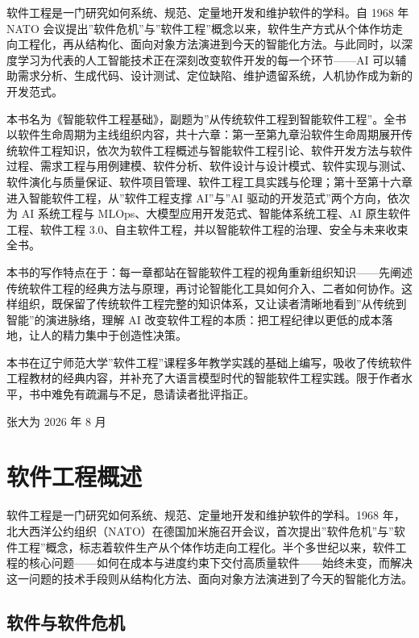\documentclass[12pt,a4paper,twoside,openany]{ctexbook}
\numberwithin{figure}{chapter}
\numberwithin{table}{chapter}
\begin{document}
软件工程是一门研究如何系统、规范、定量地开发和维护软件的学科。自 1968 年
NATO
会议提出''软件危机''与''软件工程''概念以来，软件生产方式从个体作坊走向工程化，再从结构化、面向对象方法演进到今天的智能化方法。与此同时，以深度学习为代表的人工智能技术正在深刻改变软件开发的每一个环节------AI
可以辅助需求分析、生成代码、设计测试、定位缺陷、维护遗留系统，人机协作成为新的开发范式。

本书名为《智能软件工程基础》，副题为''从传统软件工程到智能软件工程''。全书以软件生命周期为主线组织内容，共十六章：第一至第九章沿软件生命周期展开传统软件工程知识，依次为软件工程概述与智能软件工程引论、软件开发方法与软件过程、需求工程与用例建模、软件分析、软件设计与设计模式、软件实现与测试、软件演化与质量保证、软件项目管理、软件工程工具实践与伦理；第十至第十六章进入智能软件工程，从''软件工程支撑
AI''与''AI 驱动的开发范式''两个方向，依次为 AI 系统工程与
MLOps、大模型应用开发范式、智能体系统工程、AI 原生软件工程、软件工程
3.0、自主软件工程，并以智能软件工程的治理、安全与未来收束全书。

本书的写作特点在于：每一章都站在智能软件工程的视角重新组织知识------先阐述传统软件工程的经典方法与原理，再讨论智能化工具如何介入、二者如何协作。这样组织，既保留了传统软件工程完整的知识体系，又让读者清晰地看到''从传统到智能''的演进脉络，理解
AI
改变软件工程的本质：把工程纪律以更低的成本落地，让人的精力集中于创造性决策。

本书在辽宁师范大学''软件工程''课程多年教学实践的基础上编写，吸收了传统软件工程教材的经典内容，并补充了大语言模型时代的智能软件工程实践。限于作者水平，书中难免有疏漏与不足，恳请读者批评指正。

张大为 2026 年 8 月

\chapter{软件工程概述}\label{ux8f6fux4ef6ux5de5ux7a0bux6982ux8ff0}

软件工程是一门研究如何系统、规范、定量地开发和维护软件的学科。1968
年，北大西洋公约组织（NATO）在德国加米施召开会议，首次提出''软件危机''与''软件工程''概念，标志着软件生产从个体作坊走向工程化。半个多世纪以来，软件工程的核心问题------如何在成本与进度约束下交付高质量软件------始终未变，而解决这一问题的技术手段则从结构化方法、面向对象方法演进到了今天的智能化方法。

\section{软件与软件危机}\label{ux8f6fux4ef6ux4e0eux8f6fux4ef6ux5371ux673a}
\end{document}
